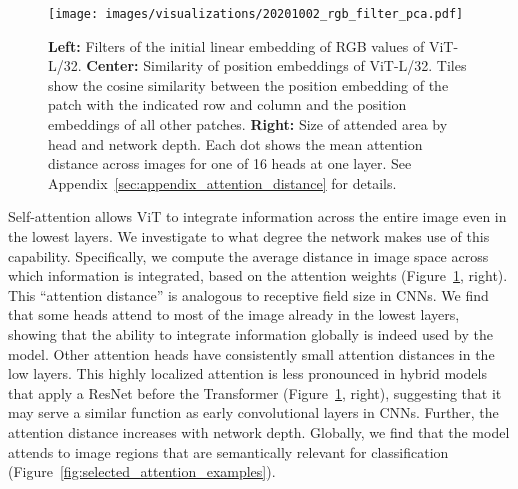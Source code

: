\documentclass{article} \usepackage{iclr2021_conference,times}
\newcommand{\oursabbrv}{ViT\xspace}
\begin{document}
\begin{figure}[t]
\vspace{3mm}
    \texttt{[image: images/visualizations/20201002\_rgb\_filter\_pca.pdf]}
    \hfill
    \hfill
    \caption{
        \textbf{Left:} Filters of the initial linear embedding of RGB values of \oursabbrv-L/32.
        \textbf{Center:} Similarity of position embeddings of \oursabbrv-L/32. Tiles show the cosine similarity between the position embedding of the patch with the indicated row and column and the position embeddings of all other patches.
        \textbf{Right:} Size of attended area by head and network depth. Each dot shows the mean attention distance across images for one of 16 heads at one layer. See Appendix~\ref{sec:appendix_attention_distance} for details.}
    \label{fig:transformer_visualization}
    \vspace{5mm}
\end{figure}

Self-attention allows \oursabbrv to integrate information across the entire image even in the lowest layers. We investigate to what degree the network makes use of this capability. Specifically, we compute the average distance in image space across which information is integrated, based on the attention weights (Figure~\ref{fig:transformer_visualization}, right). This ``attention distance'' is analogous to receptive field size in CNNs. We find that some heads attend to most of the image already in the lowest layers, showing that the ability to integrate information globally is indeed used by the model. Other attention heads have consistently small attention distances in the low layers. This highly localized attention is less pronounced in hybrid models that apply a ResNet before the Transformer (Figure~\ref{fig:transformer_visualization}, right), suggesting that it may serve a similar function as early convolutional layers in CNNs. 
Further, the attention distance increases with network depth.
Globally, we find that the model attends to image regions that are semantically relevant for classification (Figure~\ref{fig:selected_attention_examples}).
\end{document}
